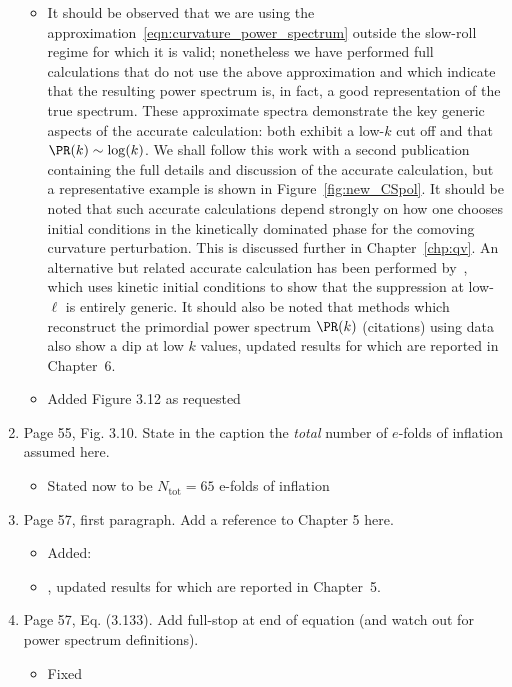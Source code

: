 \documentclass[11pt]{article}
\begin{document}
\begin{enumerate}
\begin{itemize}
      \item It should be observed that we are using the approximation~\eqref{eqn:curvature_power_spectrum} outside the slow-roll regime for which it is valid; nonetheless we have performed full calculations that do not use the above approximation and which indicate that the resulting power spectrum is, in fact, a good representation of the true spectrum. These approximate spectra demonstrate the key generic aspects of the accurate calculation: both exhibit a low-\(k\) cut off and that \(\PR(k) \sim \log(k)\).  We shall follow this work with a second publication containing the full details and discussion of the accurate calculation, but a representative example is shown in Figure~\ref{fig:new_CSpol}. It should be noted that such accurate calculations depend strongly on how one chooses initial conditions in the kinetically dominated phase for the comoving curvature perturbation. This is discussed further in Chapter~\ref{chp:qv}. An alternative but related accurate calculation has been performed by~\cite{Lello_tensor_2013}, which uses kinetic initial conditions to show that the suppression at low-\(\ell\) is entirely generic. It should also be noted that methods which reconstruct the primordial power spectrum \(\PR(k)\) (citations) using data also show a dip at low \(k\) values, updated results for which are reported in Chapter~6.
      \item Added Figure 3.12 as requested
  \end{itemize}
\item Page 55, Fig. 3.10. State in the caption the \emph{total} number
  of $e$-folds of inflation assumed here.
  \begin{itemize}
    \item Stated now to be $N_\mathrm{tot}=65$ e-folds of inflation
  \end{itemize}
\item Page 57, first paragraph. Add a reference to Chapter 5 here.
  \begin{itemize}
    \item Added:
    \item , updated results for which are reported in Chapter~5.
  \end{itemize}
\item Page 57, Eq. (3.133). Add full-stop at end of equation (and
  watch out for power spectrum definitions).
  \begin{itemize}
    \item Fixed
  \end{itemize}

\end{enumerate}
\end{document}
